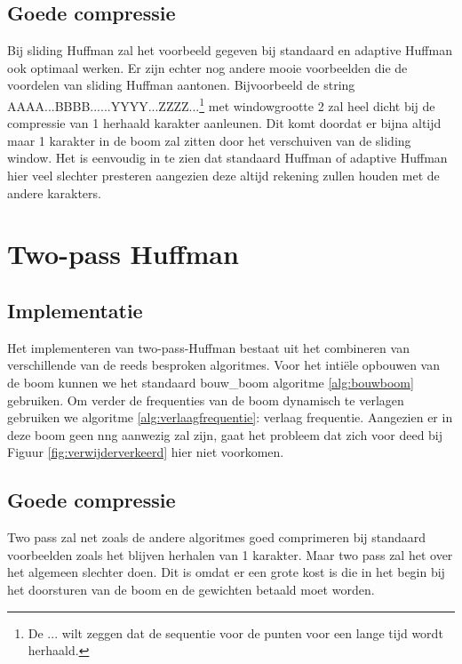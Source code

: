 \documentclass[twoside,twocolumn]{article}
\begin{document}
    \subsection{Goede compressie}
     Bij sliding Huffman zal het voorbeeld gegeven bij standaard en adaptive Huffman ook optimaal werken. Er zijn echter nog andere mooie voorbeelden die de voordelen van sliding Huffman aantonen.
     Bijvoorbeeld de string AAAA...BBBB......YYYY...ZZZZ...\label{string-voorbeeld}\footnote{De ... wilt zeggen dat de sequentie voor de punten voor een lange tijd wordt herhaald. } met windowgrootte 2 zal heel dicht bij de compressie van 1 herhaald karakter aanleunen. Dit komt doordat er bijna altijd maar 1 karakter in de boom zal zitten door het verschuiven van de sliding window. 
     Het is eenvoudig in te zien dat standaard Huffman of adaptive Huffman hier veel slechter presteren aangezien deze altijd rekening zullen houden met de andere karakters.
     
\section{Two-pass Huffman}

    \subsection{Implementatie}
        Het implementeren van two-pass-Huffman bestaat uit het combineren van verschillende van de 
         reeds besproken algoritmes. Voor het intiële opbouwen van de boom kunnen we het standaard bouw\_boom algoritme \ref{alg:bouwboom} gebruiken.  Om verder de frequenties van de boom dynamisch
         te verlagen gebruiken we algoritme 
         \ref{alg:verlaagfrequentie}: verlaag frequentie. 
        Aangezien er in deze boom geen nng aanwezig zal zijn, gaat het probleem dat zich voor deed
         bij Figuur \ref{fig:verwijderverkeerd} hier niet voorkomen.
         
    \subsection{Goede compressie}
        Two pass zal net zoals de andere algoritmes goed comprimeren bij standaard voorbeelden zoals het blijven herhalen van 1 karakter. Maar two pass zal het over het algemeen slechter doen. Dit is omdat er een grote kost is die in het begin bij het doorsturen van de boom en de gewichten betaald moet worden.
\end{document}
